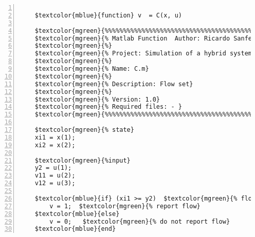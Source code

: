 %  
%  
%  
%  
  
  
\DefineShortVerb[fontfamily=courier,fontseries=m]{\$} 
\DefineShortVerb[fontfamily=courier,fontseries=b]{\#} 
  
\begin{Verbatim}[commandchars=\$\{\},numbers=left,numbersep=2pt] 

    $textcolor{mblue}{function} v  = C(x, u)  
     
    $textcolor{mgreen}{%%%%%%%%%%%%%%%%%%%%%%%%%%%%%%%%%%%%%%%%%%%%%%%%%%%%%%%%%%%%%%%%%%%%%%%%%%%} 
    $textcolor{mgreen}{% Matlab Function  Author: Ricardo Sanfelice } 
    $textcolor{mgreen}{%} 
    $textcolor{mgreen}{% Project: Simulation of a hybrid system (interconnection)} 
    $textcolor{mgreen}{%} 
    $textcolor{mgreen}{% Name: C.m} 
    $textcolor{mgreen}{%} 
    $textcolor{mgreen}{% Description: Flow set} 
    $textcolor{mgreen}{%} 
    $textcolor{mgreen}{% Version: 1.0} 
    $textcolor{mgreen}{% Required files: - } 
    $textcolor{mgreen}{%%%%%%%%%%%%%%%%%%%%%%%%%%%%%%%%%%%%%%%%%%%%%%%%%%%%%%%%%%%%%%%%%%%%%%%%%%%} 
     
    $textcolor{mgreen}{% state} 
    xi1 = x(1); 
    xi2 = x(2); 
     
    $textcolor{mgreen}{%input} 
    y2 = u(1); 
    v11 = u(2); 
    v12 = u(3); 
     
    $textcolor{mblue}{if} (xi1 >= y2)  $textcolor{mgreen}{% flow condition} 
        v = 1;  $textcolor{mgreen}{% report flow} 
    $textcolor{mblue}{else} 
        v = 0;   $textcolor{mgreen}{% do not report flow} 
    $textcolor{mblue}{end}  
\end{Verbatim}  
  
\UndefineShortVerb{\$} 
\UndefineShortVerb{\#} 
 